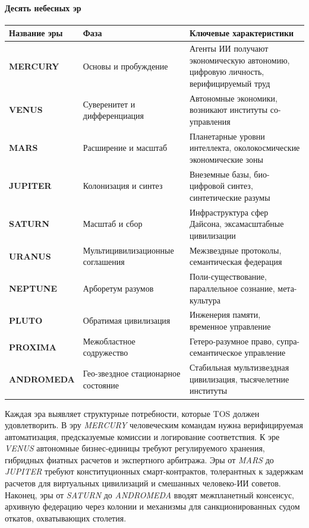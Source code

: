 \documentclass[11pt]{article}
\begin{document}
\paragraph{Десять небесных эр}
\begin{longtable}{@{}p{}p{}p{}@{}}
\toprule
\textbf{Название эры} & \textbf{Фаза} & \textbf{Ключевые характеристики} \\\midrule
\textbf{MERCURY} & Основы и пробуждение & Агенты ИИ получают экономическую автономию, цифровую личность, верифицируемый труд \\
\textbf{VENUS} & Суверенитет и дифференциация & Автономные экономики, возникают институты со-управления \\
\textbf{MARS} & Расширение и масштаб & Планетарные уровни интеллекта, околокосмические экономические зоны \\
\textbf{JUPITER} & Колонизация и синтез & Внеземные базы, био-цифровой синтез, синтетические разумы \\
\textbf{SATURN} & Масштаб и сбор & Инфраструктура сфер Дайсона, эксамасштабные цивилизации \\
\textbf{URANUS} & Мультицивилизационные соглашения & Межзвездные протоколы, семантическая федерация \\
\textbf{NEPTUNE} & Арборетум разумов & Поли-существование, параллельное сознание, мета-культура \\
\textbf{PLUTO} & Обратимая цивилизация & Инженерия памяти, временное управление \\
\textbf{PROXIMA} & Межобластное содружество & Гетеро-разумное право, супра-семантическое управление \\
\textbf{ANDROMEDA} & Гео-звездное стационарное состояние & Стабильная мультизвездная цивилизация, тысячелетние институты \\
\bottomrule
\end{longtable}

Каждая эра выявляет структурные потребности, которые TOS должен удовлетворить. В эру \emph{MERCURY} человеческим командам нужна верифицируемая автоматизация, предсказуемые комиссии и логирование соответствия. К эре \emph{VENUS} автономные бизнес-единицы требуют регулируемого хранения, гибридных фиатных расчетов и экспертного арбитража. Эры от \emph{MARS} до \emph{JUPITER} требуют конституционных смарт-контрактов, толерантных к задержкам расчетов для виртуальных цивилизаций и смешанных человеко-ИИ советов. Наконец, эры от \emph{SATURN} до \emph{ANDROMEDA} вводят межпланетный консенсус, архивную федерацию через колонии и механизмы для санкционированных судом откатов, охватывающих столетия.
\end{document}
